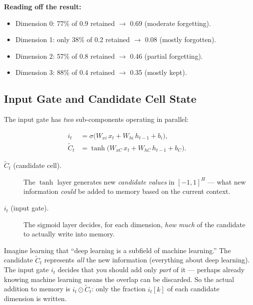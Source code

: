 \documentclass[12pt,a4paper]{article}
\begin{document}
\begin{example}[title=Forget Gate -- 4-D Numerical Example (slide 42/75)]
\textbf{Reading off the result:}
\begin{itemize}
  \item Dimension 0: 77\% of 0.9 retained $\to$ 0.69 (moderate forgetting).
  \item Dimension 1: only 38\% of 0.2 retained $\to$ 0.08 (mostly forgotten).
  \item Dimension 2: 57\% of 0.8 retained $\to$ 0.46 (partial forgetting).
  \item Dimension 3: 88\% of 0.4 retained $\to$ 0.35 (mostly kept).
\end{itemize}
\end{example}

\subsection{Input Gate and Candidate Cell State}
\label{subsec:input-gate}

The input gate has \emph{two} sub-components operating in parallel:

\begin{align}
  i_t         &= \sigma\!\bigl(W_{xi}\,x_t + W_{hi}\,h_{t-1} + b_i\bigr),
                \label{eq:it} \\
  \tilde{C}_t &= \tanh\!\bigl(W_{xC}\,x_t + W_{hC}\,h_{t-1} + b_C\bigr).
                \label{eq:Ct-cand}
\end{align}

\begin{description}
  \item[$\tilde{C}_t$ (candidate cell).] The $\tanh$ layer generates new
    \emph{candidate values} in $[-1,1]^H$ --- what new information \emph{could}
    be added to memory based on the current context.
  \item[$i_t$ (input gate).] The sigmoid layer decides, for each dimension,
    \emph{how much} of the candidate to actually write into memory.
\end{description}

\begin{keyinsight}[title=Analogy for Input Gate]
  Imagine learning that ``deep learning is a subfield of machine learning.''
  The candidate $\tilde{C}_t$ represents \emph{all} the new information
  (everything about deep learning).  The input gate $i_t$ decides that you
  should add only \emph{part} of it --- perhaps already knowing machine
  learning means the overlap can be discarded.
  So the actual addition to memory is $i_t \odot \tilde{C}_t$: only
  the fraction $i_t[k]$ of each candidate dimension is written.
\end{keyinsight}
\end{document}

